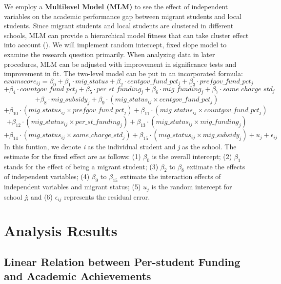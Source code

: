 \documentclass[
  man,
  floatsintext,
  longtable,
  nolmodern,
  notxfonts,
  notimes,
  colorlinks=true,linkcolor=blue,citecolor=blue,urlcolor=blue]{apa7}
\begin{document}
We employ a \textbf{Multilevel Model (MLM)} to see the effect of
independent variables on the academic performance gap between migrant
students and local students. Since migrant students and local students
are clustered in different schools, MLM can provide a hierarchical model
fitness that can take cluster effect into account
(). We will implement random intercept, fixed slope model to examine
the research question primarily. When analyzing data in later
procedures, MLM can be adjusted with improvement in significance tests
and improvement in fit. The two-level model can be put in an
incorporated formula:
\[ examscore_{ij}= \beta_0 + \beta_1 \cdot mig\_status + \beta_2 \cdot centgov\_fund\_pct_j + \beta_3 \cdot prefgov\_fund\_pct_j \]
\[+\beta_4 \cdot countgov\_fund\_pct_j + \beta_5 \cdot per\_st\_funding_j + \beta_6 \cdot mig\_funding_j + \beta_7 \cdot same\_charge\_std_j\]
\[ + \beta_8 \cdot mig\_subsidy_j  + \beta_9 \cdot (mig\_status_{ij} \times centgov\_fund\_pct_j) \]
\[ + \beta_{10} \cdot (mig\_status_{ij} \times prefgov\_fund\_pct_j) + \beta_{11} \cdot (mig\_status_{ij} \times countgov\_fund\_pct_j) \]
\[ + \beta_{12} \cdot (mig\_status_{ij} \times per\_st\_funding_j)  + \beta_{13} \cdot (mig\_status_{ij} \times mig\_funding_j) \]
\[ + \beta_{14} \cdot (mig\_status_{ij} \times same\_charge\_std_j)  + \beta_{15} \cdot (mig\_status_{ij} \times mig\_subsidy_j) + u_j + \epsilon_{ij} \]
In this funtion, we denote \emph{i} as the individual student and
\emph{j} as the school. The estimate for the fixed effect are as
follows: (1) \(\beta_0\) is the overall intercept; (2) \(\beta_1\)
stands for the effect of being a migrant student; (3) \(\beta_2\) to
\(\beta_8\) extimate the effects of independent variables; (4)
\(\beta_9\) to \(\beta_15\) extimate the interaction effects of
independent variables and migrant status; (5) \(u_j\) is the random
intercept for school \emph{j}; and (6) \(\epsilon_{ij}\) represents the
residual error.

\section{Analysis Results}\label{analysis-results}

\subsection{Linear Relation between Per-student Funding and Academic
Achievements}\label{linear-relation-between-per-student-funding-and-academic-achievements}
\end{document}
